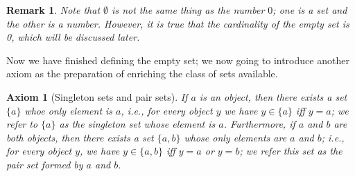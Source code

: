 \documentclass[a4paper,oneside]{book}
\newtheorem{axiom}{Axiom}[chapter]
\newtheorem{remark}{Remark}[section]
\begin{document}
			\begin{remark}
				Note that $\emptyset$ is not the same thing as the number $0$; one is a set and the other is a number. However, it is true that the cardinality of the empty set is 0, which will be discussed later.
			\end{remark}
			Now we have finished defining the empty set; we now going to introduce another axiom as the preparation of enriching the class of sets available.
			\begin{axiom}[Singleton sets and pair sets]
				If $a$ is an object, then there exists a set $\{a\}$ whoe only element is $a$, \textit{i.e.,} for every object $y$ we have $y\in\{a\}$ iff $y=a$; we refer to $\{a\}$ as the singleton set whose element is $a$. Furthermore, if $a$ and $b$ are both objects, then there exists a set $\{a,b\}$ whose only elements are $a$ and $b$; \textit{i.e.,} for every object $y$, we have $y\in\{a,b\}$ iff $y=a$ or $y=b$; we refer this set as the pair set formed by $a$ and $b$.
			\end{axiom}
\end{document}
